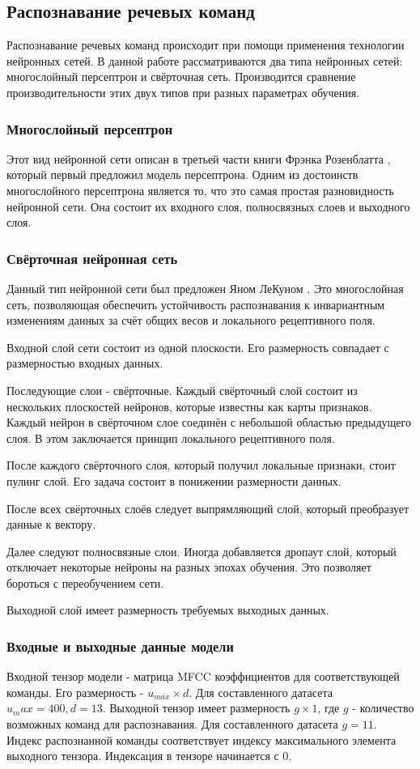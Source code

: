 \subsection{Распознавание речевых команд}
Распознавание речевых команд происходит при помощи применения технологии нейронных сетей. В данной работе рассматриваются два типа нейронных сетей: многослойный персептрон и свёрточная сеть. Производится сравнение производительности этих двух типов при разных параметрах обучения.
\subsubsection{Многослойный персептрон}
Этот вид нейронной сети описан в третьей части книги Фрэнка Розенблатта \cite{Perceptron}, который первый предложил модель персептрона. Одним из достоинств многослойного персептрона является то, что это самая простая разновидность нейронной сети. Она состоит их входного слоя, полносвязных слоев и выходного слоя.
\subsubsection{Свёрточная нейронная сеть}
Данный тип нейронной сети был предложен Яном ЛеКуном \cite{CNN}. Это многослойная сеть, позволяющая обеспечить устойчивость распознавания к инвариантным изменениям данных за счёт общих весов и локального рецептивного поля.

Входной слой сети состоит из одной плоскости. Его размерность совпадает с размерностью входных данных. 

Последующие слои - свёрточные. Каждый свёрточный слой состоит из нескольких плоскостей нейронов, которые известны как карты признаков. Каждый нейрон в свёрточном слое соединён с небольшой областью предыдущего слоя. В этом заключается принцип локального рецептивного поля.

После каждого свёрточного слоя, который получил локальные признаки, стоит пулинг слой. Его задача состоит в понижении размерности данных.

После всех свёрточных слоёв следует выпрямляющий слой, который преобразует данные к вектору. 

Далее следуют полносвязные слои. Иногда добавляется дропаут слой, который отключает некоторые нейроны на разных эпохах обучения. Это позволяет бороться с переобучением сети.

Выходной слой имеет размерность требуемых выходных данных. 

\subsubsection{Входные и выходные данные модели}
Входной тензор модели - матрица MFCC коэффициентов для соответствующей команды. Его размерность - $u_{max} \times d$. Для составленного датасета $u_max=400, d=13$.
Выходной тензор имеет размерность $g \times 1$, где $g$ - количество возможных команд для распознавания. Для составленного датасета $g=11$. Индекс распознанной команды соответствует индексу максимального элемента выходного тензора. Индексация в тензоре начинается с 0.
